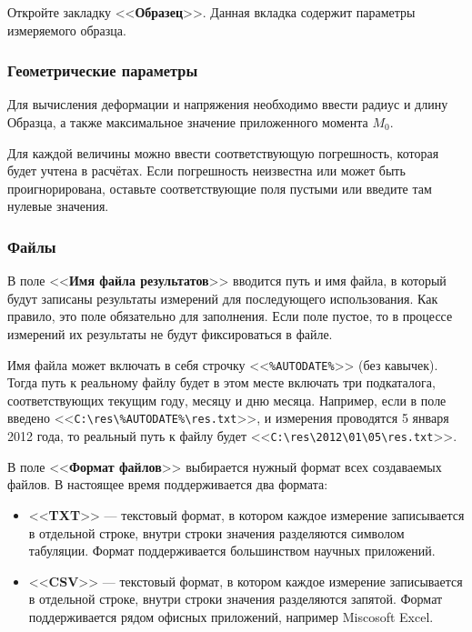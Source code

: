 \documentclass[12pt, a4paper, twocolumn]{report}
\newcommand{\CTL}[1]{<<{\bf #1}>>}
\newcommand{\CMD}[1]{<<{\tt #1}>>}
\begin{document}
Откройте закладку \CTL{Образец}. Данная вкладка содержит параметры измеряемого образца.

\subsubsection{Геометрические параметры}
\label{sec_geom_params}

Для вычисления деформации и напряжения необходимо ввести радиус и длину Образца, а также максимальное значение приложенного момента $M_0$.

Для каждой величины можно ввести соответствующую погрешность, которая будет учтена в расчётах. Если погрешность неизвестна или может быть проигнорирована, оставьте соответствующие поля пустыми или введите там нулевые значения.

\subsubsection{Файлы}

В поле \CTL{Имя файла результатов} вводится путь и имя файла, в который будут записаны результаты измерений для последующего использования. Как правило, это поле обязательно для заполнения. Если поле пустое, то в процессе измерений их результаты не будут фиксироваться в файле.

Имя файла может включать в себя строчку \CMD{\%AUTODATE\%} (без кавычек). Тогда путь к реальному файлу будет в этом месте включать три
 подкаталога, соответствующих текущим году, месяцу и дню месяца. Например, если в поле введено \CMD{C:\textbackslash{}res\textbackslash{}\%AUTODATE\%\textbackslash{}res.txt}, и измерения проводятся 5 января 2012 года, то реальный путь к файлу будет \CMD{C:\textbackslash{}res\textbackslash{}2012\textbackslash{}01\textbackslash{}05\textbackslash{}res.txt}.

В поле \CTL{Формат файлов} выбирается нужный формат всех создаваемых файлов. В настоящее время поддерживается два формата:

\begin{itemize}
\item \CTL{TXT} --- текстовый формат, в котором каждое измерение записывается в отдельной строке, внутри строки значения разделяются символом табуляции. Формат поддерживается большинством научных приложений.
\item \CTL{CSV} --- текстовый формат, в котором каждое измерение записывается в отдельной строке, внутри строки значения разделяются запятой. Формат поддерживается рядом офисных приложений, например Miscosoft Excel.
\end{itemize}
\end{document}
